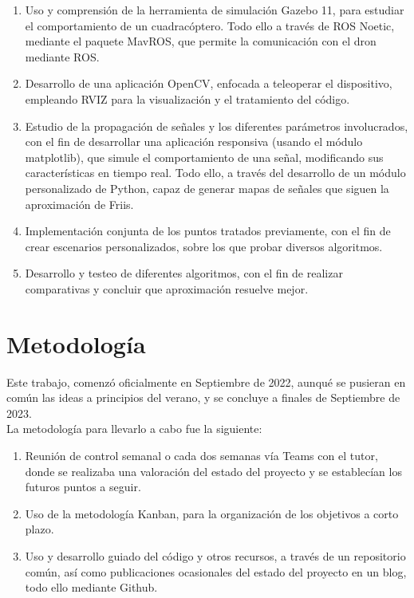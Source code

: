 \begin{enumerate}
	\item Uso y comprensión de la herramienta de simulación Gazebo 11, para estudiar el comportamiento de un cuadracóptero. Todo ello a través de \ac{ROS} Noetic, mediante el paquete MavROS, que permite la comunicación con el dron mediante \ac{ROS}.
	\item Desarrollo de una aplicación OpenCV, enfocada a teleoperar el dispositivo, empleando RVIZ para la visualización y el tratamiento del código.
	\item Estudio de la propagación de señales y los diferentes parámetros involucrados, con el fin de desarrollar una aplicación responsiva (usando el módulo matplotlib), que simule el comportamiento de una señal, modificando sus características en tiempo real. Todo ello, a través del desarrollo de un módulo personalizado de Python, capaz de generar mapas de señales que siguen la aproximación de Friis.
	\item Implementación conjunta de los puntos tratados previamente, con el fin de crear escenarios personalizados, sobre los que probar diversos algoritmos.
	\item Desarrollo y testeo de diferentes algoritmos, con el fin de realizar comparativas y concluir que aproximación resuelve mejor.
\end{enumerate}

\section{Metodología}
\label{sec:metodologia}

Este trabajo, comenzó oficialmente en Septiembre de 2022, aunqué se pusieran en común las ideas a principios del verano, y se concluye a finales de Septiembre de 2023.\\ 

La metodología para llevarlo a cabo fue la siguiente:

\begin{enumerate}
	\item Reunión de control semanal o cada dos semanas vía Teams con el tutor, donde se realizaba una valoración del estado del proyecto y se establecían los futuros puntos a seguir.
	\item Uso de la metodología Kanban, para la organización de los objetivos a corto plazo.
	\item Uso y desarrollo guiado del código y otros recursos, a través de un repositorio común, así como publicaciones ocasionales del estado del proyecto en un blog, todo ello mediante Github.
\end{enumerate}

